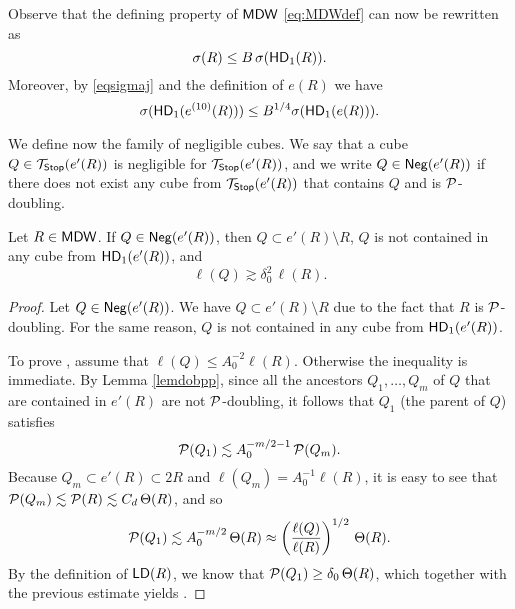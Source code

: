 Observe that the defining property of ${\mathsf{MDW}}$ \eqref{eq:MDWdef} can now be rewritten as 
\begin{equation}\label{eq:MDWdef2}
	\sigma(R)\le B\, \sigma({\mathsf{HD}}_1(R)).
\end{equation}
Moreover, by \eqref{eqsigmaj} and the definition of $e(R)$ we have
\begin{equation}\label{eq:sigmae'lesigmae}
\sigma({\mathsf{HD}}_1(e^{(10)}(R)))\le B^{1/4}\sigma({\mathsf{HD}}_1(e(R))).
\end{equation}

We define now the family of negligible cubes. We say that a cube $Q\in{\mathcal T}_{\mathsf {Stop}}(e'(R))$ is negligible for ${\mathcal T}_{\mathsf {Stop}}(e'(R))$, and we write $Q\in{\mathsf{Neg}}(e'(R))$ if
there does not exist any cube from ${\mathcal T}_{\mathsf {Stop}}(e'(R))$ that contains $Q$ and is ${\mathcal P}$-doubling.  

\vv
\begin{lemma}\label{lemnegs}
Let $R\in{\mathsf{MDW}}$. If $Q\in{\mathsf{Neg}}(e'(R))$, then $Q\subset e'(R)\setminus R$, $Q$ is not contained in any cube from ${\mathsf{HD}}_1(e'(R))$, and
\begin{equation}\label{eqcostat}
\ell(Q) \gtrsim \delta_0^{2}\,\ell(R).
\end{equation}
\end{lemma}

\begin{proof}
Let $Q\in{\mathsf{Neg}}(e'(R))$. We have $Q\subset e'(R)\setminus R$ due to the fact that $R$ is ${\mathcal P}$-doubling.
For the same reason, $Q$ is not contained in any cube from ${\mathsf{HD}}_1(e'(R))$.


To prove , assume that $\ell(Q)\leq A_0^{-2}\ell(R)$. Otherwise the inequality is immediate.
By Lemma \ref{lemdobpp}, since all the ancestors $Q_1,\ldots,Q_m$ of $Q$ that are contained in $e'(R)$ are not ${\mathcal P}$-doubling, it follows that $Q_1$ (the parent of $Q$) satisfies
$${\mathcal P}(Q_1)\lesssim A_0^{-m/2-1}\,{\mathcal P}(Q_m).$$
Because $Q_m\subset e'(R)\subset 2R$ and $\ell(Q_m)=A_0^{-1}\ell(R)$, it is easy to see that ${\mathcal P}(Q_m)\lesssim {\mathcal P}(R)\lesssim C_{d}\,\Theta(R)$, and so
\begin{equation*}
{\mathcal P}(Q_1)\lesssim A_0^{-m/2}\,\Theta(R)\approx\left(\frac{\ell(Q)}{\ell(R)}\right)^{1/2}\,\Theta(R).
\end{equation*}
By the definition of ${\mathsf{LD}}(R)$, we know that ${\mathcal P}(Q_1)\geq\delta_0\,\Theta(R)$, which together with 
the previous estimate yields .
\end{proof}
\vv


